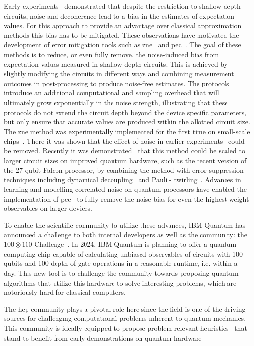 Early experiments~\cite{kandala2017hardware} demonstrated that despite the restriction to shallow-depth circuits, noise and decoherence lead to a bias in the estimates of expectation values. For this approach to provide an advantage over classical approximation methods this bias has to be mitigated. These observations have motivated the development of error mitigation tools such as \gls{zne}~\cite{Li2017Efficient,Temme2017Error} and \gls{pec}~\cite{Temme2017Error}. The goal of these methods is to reduce, or even fully remove, the noise-induced bias from expectation values measured in shallow-depth circuits. This is achieved by slightly modifying the circuits in different ways and combining measurement outcomes in post-processing to produce noise-free estimates. The protocols introduce an additional computational and sampling overhead that will ultimately grow exponentially in the noise strength, illustrating that these protocols do not extend the circuit depth beyond the device specific parameters, but only ensure that accurate values are produced within the allotted circuit size. The \gls{zne} method was experimentally implemented for the first time on small-scale chips~\cite{Kandala2019Error}. There it was shown that the effect of noise in earlier experiments~\cite{kandala2017hardware} could be removed. Recently it was demonstrated~\cite{Kim2022Scalable} that this method could be scaled to larger circuit sizes on improved quantum hardware, such as the recent version of the 27 qubit Falcon processor, by combining the method with error suppression techniques including dynamical decoupling~\cite{viola1998dynamical,viola1999dynamical} and Pauli - twirling~\cite{Bennett1996Purification,KnillFault2004,Kern2005Quantum}. Advances in learning and modelling correlated noise on quantum processors have enabled the implementation of \gls{pec}~\cite{Berg2022Probabilistic} to fully remove the noise bias for even the highest weight observables on larger devices.

To enable the scientific community to utilize these advances, IBM Quantum has announced a challenge to both internal developers as well as the community: the $100\otimes 100$ Challenge~\cite{IBM_100by100}. In 2024, IBM Quantum is planning to offer a quantum computing chip capable of calculating unbiased observables of circuits with 100 qubits and 100 depth of gate operations in a reasonable runtime, i.e. within a day. This new tool is to challenge the community towards proposing quantum algorithms that utilize this hardware to solve interesting problems, which are notoriously hard for classical computers. 

The \gls{hep} community plays a pivotal role here since the field is one of the driving sources for challenging computational problems inherent to quantum mechanics. This community is ideally equipped to propose problem relevant heuristics~\cite{RevModPhys.94.015004,Preskill2018} that stand to benefit from early demonstrations on quantum hardware 

